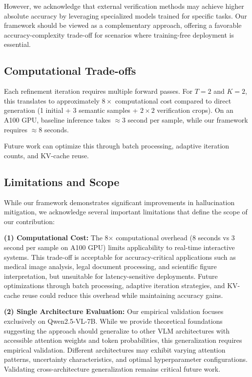 \documentclass[12pt]{article}
\begin{document}
However, we acknowledge that external verification methods \citep{yin2023woodpecker} may achieve higher absolute accuracy by leveraging specialized models trained for specific tasks. Our framework should be viewed as a complementary approach, offering a favorable accuracy-complexity trade-off for scenarios where training-free deployment is essential.

\subsection{Computational Trade-offs}

Each refinement iteration requires multiple forward passes. For $T=2$ and $K=2$, this translates to approximately $8\times$ computational cost compared to direct generation (1 initial + 3 semantic samples + $2 \times 2$ verification crops). On an A100 GPU, baseline inference takes $\approx 3$ second per sample, while our framework requires $\approx 8$ seconds.

Future work can optimize this through batch processing, adaptive iteration counts, and KV-cache reuse.

\subsection{Limitations and Scope}

While our framework demonstrates significant improvements in hallucination mitigation, we acknowledge several important limitations that define the scope of our contribution:

\vspace{1em}

\textbf{(1) Computational Cost:} The 8× computational overhead (8 seconds vs 3 second per sample on A100 GPU) limits applicability to real-time interactive systems. This trade-off is acceptable for accuracy-critical applications such as medical image analysis, legal document processing, and scientific figure interpretation, but unsuitable for latency-sensitive deployments. Future optimizations through batch processing, adaptive iteration strategies, and KV-cache reuse could reduce this overhead while maintaining accuracy gains.

\vspace{1em}

\textbf{(2) Single Architecture Evaluation:} Our empirical validation focuses exclusively on Qwen2.5-VL-7B. While we provide theoretical foundations suggesting the approach should generalize to other VLM architectures with accessible attention weights and token probabilities, this generalization requires empirical validation. Different architectures may exhibit varying attention patterns, uncertainty characteristics, and optimal hyperparameter configurations. Validating cross-architecture generalization remains critical future work.
\end{document}
